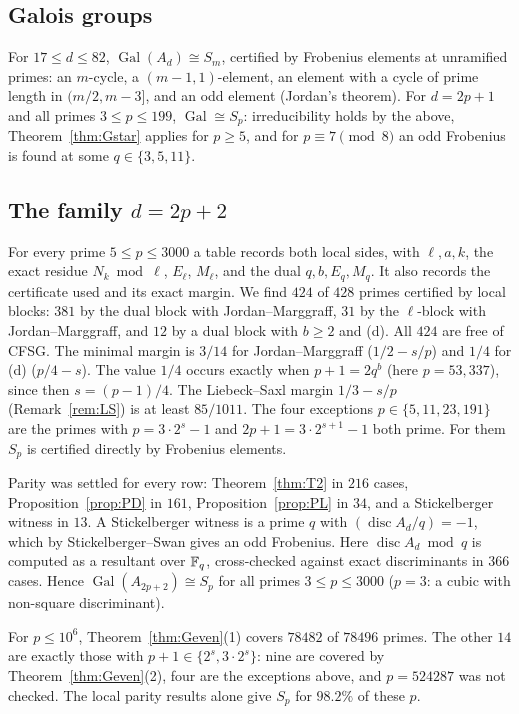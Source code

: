 \documentclass[11pt]{amsart}
\theoremstyle{definition}\newtheorem{definition}[theorem]{Definition}\newtheorem{example}[theorem]{Example}
\theoremstyle{remark}\newtheorem{remark}[theorem]{Remark}
\newcommand{\Gal}{\operatorname{Gal}}\newcommand{\disc}{\operatorname{disc}}\newcommand{\Res}{\operatorname{Res}}
\begin{document}
\subsection*{Galois groups}
For $17\le d\le82$, $\Gal(A_d)\cong S_m$, certified by Frobenius elements at unramified primes: an $m$-cycle, a $(m-1,1)$-element, an element with
a cycle of prime length in $(m/2,m-3]$, and an odd element (Jordan's theorem). For $d=2p+1$ and all primes $3\le p\le199$, $\Gal\cong S_p$:
irreducibility holds by the above, Theorem~\ref{thm:Gstar} applies for $p\ge5$, and for $p\equiv7\pmod8$ an odd Frobenius is found at some
$q\in\{3,5,11\}$.

\subsection*{The family $d=2p+2$}
For every prime $5\le p\le3000$ a table records both local sides, with $\ell,a,k$, the exact residue $N_k\bmod\ell$, $E_\ell$, $M_\ell$, and the
dual $q,b,E_q,M_q$. It also records the certificate used and its exact margin. We find $424$ of $428$ primes certified by local blocks: $381$
by the dual block with Jordan--Marggraff, $31$ by the $\ell$-block with Jordan--Marggraff, and $12$ by a dual block with $b\ge2$ and (d). All
$424$ are free of CFSG. The minimal margin is $3/14$ for Jordan--Marggraff ($1/2-s/p$) and $1/4$ for (d) ($p/4-s$). The value $1/4$ occurs exactly when $p+1=2q^b$ (here $p=53,337$), since then $s=(p-1)/4$. The Liebeck--Saxl margin $1/3-s/p$
(Remark~\ref{rem:LS}) is at least $85/1011$. The four exceptions $p\in\{5,11,23,191\}$ are the primes
with $p=3\cdot2^s-1$ and $2p+1=3\cdot2^{s+1}-1$ both prime. For them $S_p$ is certified directly by Frobenius elements.

Parity was settled for every row: Theorem~\ref{thm:T2} in $216$ cases, Proposition~\ref{prop:PD} in $161$, Proposition~\ref{prop:PL} in $34$, and a
Stickelberger witness in $13$. A Stickelberger witness is a prime $q$ with $(\disc A_d/q)=-1$, which by Stickelberger--Swan \cite{Swan} gives an odd
Frobenius. Here $\disc A_d\bmod q$ is computed as a resultant over $\mathbb F_q$, cross-checked against exact discriminants in $366$ cases. Hence
$\Gal(A_{2p+2})\cong S_p$ for all primes $3\le p\le3000$ ($p=3$: a cubic with non-square discriminant).

For $p\le10^6$, Theorem~\ref{thm:Geven}(1) covers $78482$ of $78496$ primes. The other $14$ are exactly those with $p+1\in\{2^s,3\cdot2^s\}$:
nine are covered by Theorem~\ref{thm:Geven}(2), four are the exceptions above, and $p=524287$ was not checked. The local parity results alone give
$S_p$ for $98.2\%$ of these $p$.
\end{document}
